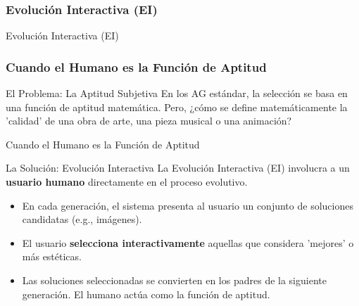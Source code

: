 \documentclass[aspectratio=169,xcolor=dvipsnames]{beamer}
\begin{document}
\subsubsection{Evolución Interactiva (EI)}

\begin{frame}{Evolución Interactiva (EI)}
    \frametitle{Cuando el Humano es la Función de Aptitud}
    \begin{block}{El Problema: La Aptitud Subjetiva}
    En los AG estándar, la selección se basa en una función de aptitud matemática. Pero, ¿cómo se define matemáticamente la 'calidad' de una obra de arte, una pieza musical o una animación?
    \end{block}
\end{frame} 

\begin{frame}{Cuando el Humano es la Función de Aptitud}
    \begin{alertblock}{La Solución: Evolución Interactiva}
    La Evolución Interactiva (EI) involucra a un \textbf{usuario humano} directamente en el proceso evolutivo.
    \begin{itemize}
        \item En cada generación, el sistema presenta al usuario un conjunto de soluciones candidatas (e.g., imágenes).
        \item El usuario \textbf{selecciona interactivamente} aquellas que considera 'mejores' o más estéticas.
        \item Las soluciones seleccionadas se convierten en los padres de la siguiente generación. El humano actúa como la función de aptitud.
    \end{itemize}
    \end{alertblock}
\end{frame}
\end{document}
